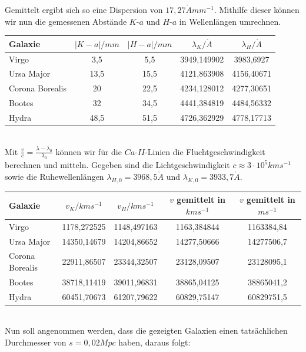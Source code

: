 \documentclass[12pt]{article}
\begin{document}
Gemittelt ergibt sich so eine Dispersion von $17,27 \mathring{A} mm^{-1}$. Mithilfe dieser können wir nun die gemessenen Abstände $K$-$a$ und $H$-$a$ in Wellenlängen umrechnen.
\begin{table}[!ht]
    \centering
    \begin{tabular}{l|c|c|c|c}
        Galaxie & $|K-a|/mm$ & $|H-a|/mm$ & $\lambda_K / \mathring{A}$ & $\lambda_H / \mathring{A}$ \\ \hline
        Virgo & 3,5 & 5,5 & 3949,149902 & 3983,6927 \\ 
        Ursa Major & 13,5 & 15,5 & 4121,863908 & 4156,40671 \\ 
        Corona Borealis & 20 & 22,5 & 4234,128012 & 4277,30651 \\ 
        Bootes & 32 & 34,5 & 4441,384819 & 4484,56332 \\ 
        Hydra & 48,5 & 51,5 & 4726,362929 & 4778,17713 \\ 
    \end{tabular}
\end{table}\\
Mit $\frac{v}{c} = \frac{\lambda - \lambda_0}{\lambda_0}$ können wir für die $Ca$-$II$-Linien die Fluchtgeschwindigkeit berechnen und mitteln. Gegeben sind die Lichtgeschwindigkeit $c \approx 3 \cdot 10^5 kms^{-1}$ sowie die Ruhewellenlängen $\lambda_{H,0} = 3968,5 \mathring{A}$ und $\lambda_{K,0} = 3933,7 \mathring{A}$.
\newpage\noindent
\begin{table}[!ht]
    \centering
    \begin{tabular}{l|c|c|c|c}
        Galaxie & $v_K / kms^{-1}$ & $v_H / kms^{-1}$ & $v$ gemittelt in $kms^{-1}$ & $v$ gemittelt in $ms^{-1}$\\ \hline
        Virgo & 1178,272525 & 1148,497163 & 1163,384844 & 1163384,84 \\ 
        Ursa Major & 14350,14679 & 14204,86652 & 14277,50666 & 14277506,7 \\
        Corona Borealis & 22911,86507 & 23344,32507 & 23128,09507 & 23128095,1 \\ 
        Bootes & 38718,11419 & 39011,96831 & 38865,04125 & 38865041,2 \\
        Hydra & 60451,70673 & 61207,79622 & 60829,75147 & 60829751,5 \\
    \end{tabular}
\end{table}\\
Nun soll angenommen werden, dass die gezeigten Galaxien einen tatsächlichen Durchmesser von $s = 0,02 Mpc$ haben, daraus folgt:
\end{document}
